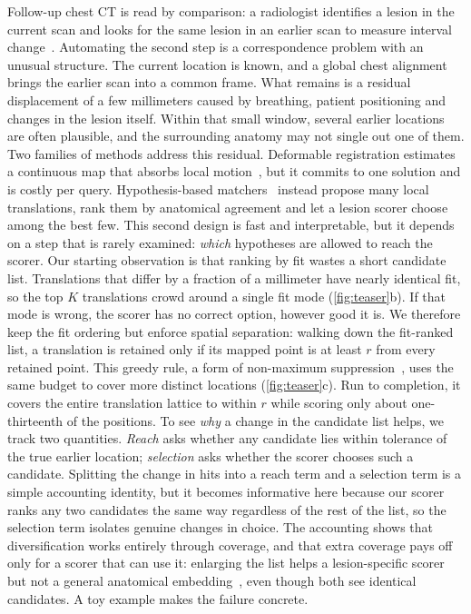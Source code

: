 Follow-up chest CT is read by comparison: a radiologist identifies a lesion in the current scan and looks for the same lesion in an earlier scan to measure interval change~\cite{rafaelpalou2021,sofka2010}.
Automating the second step is a correspondence problem with an unusual structure.
The current location is known, and a global chest alignment brings the earlier scan into a common frame.
What remains is a residual displacement of a few millimeters caused by breathing, patient positioning and changes in the lesion itself.
Within that small window, several earlier locations are often plausible, and the surrounding anatomy may not single out one of them. Two families of methods address this residual.
Deformable registration estimates a continuous map that absorbs local motion~\cite{rueckert1999,ghazipour2021}, but it commits to one solution and is costly per query.
Hypothesis-based matchers~\cite{sofka2010} instead propose many local translations, rank them by anatomical agreement and let a lesion scorer choose among the best few.
This second design is fast and interpretable, but it depends on a step that is rarely examined: \emph{which} hypotheses are allowed to reach the scorer. Our starting observation is that ranking by fit wastes a short candidate list.
Translations that differ by a fraction of a millimeter have nearly identical fit, so the top $K$ translations crowd around a single fit mode (\cref{fig:teaser}b).
If that mode is wrong, the scorer has no correct option, however good it is.
We therefore keep the fit ordering but enforce spatial separation: walking down the fit-ranked list, a translation is retained only if its mapped point is at least $r$ from every retained point.
This greedy rule, a form of non-maximum suppression~\cite{neubeck2006nms}, uses the same budget to cover more distinct locations (\cref{fig:teaser}c).
Run to completion, it covers the entire translation lattice to within $r$ while scoring only about one-thirteenth of the positions. To see \emph{why} a change in the candidate list helps, we track two quantities.
\emph{Reach} asks whether any candidate lies within tolerance of the true earlier location; \emph{selection} asks whether the scorer chooses such a candidate.
Splitting the change in hits into a reach term and a selection term is a simple accounting identity, but it becomes informative here because our scorer ranks any two candidates the same way regardless of the rest of the list, so the selection term isolates genuine changes in choice.
The accounting shows that diversification works entirely through coverage, and that extra coverage pays off only for a scorer that can use it: enlarging the list helps a lesion-specific scorer but not a general anatomical embedding~\cite{yan2022sam}, even though both see identical candidates. A toy example makes the failure concrete.

